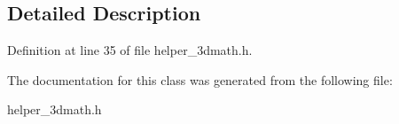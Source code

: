 \subsection{Detailed Description}


Definition at line 35 of file helper\+\_\+3dmath.\+h.



The documentation for this class was generated from the following file\+:\begin{DoxyCompactItemize}
\item 
helper\+\_\+3dmath.\+h\end{DoxyCompactItemize}
